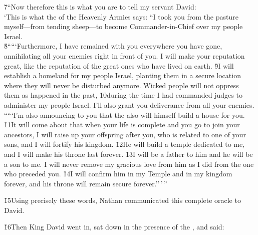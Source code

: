 \begin{poetry}
\poeml \v{7}``Now therefore this is what you are to tell my servant David: \\
\poeml `This is what the  of the Heavenly Armies says: ``I took you from the pasture myself---from tending sheep---to become Commander-in-Chief over my people Israel. \\
\poeml \v{8}`````Furthermore, I have remained with you everywhere you have gone, annihilating all your enemies right in front of you. I will make your reputation great, like the reputation of the great ones who have lived on earth. \v{9}I will establish a homeland for my people Israel, planting them in a secure location where they will never be disturbed anymore. Wicked people will not oppress them as happened in the past, \v{10}during the time I had commanded judges to administer my people Israel. I'll also grant you deliverance from all your enemies. \\
\poeml `````I'm also announcing to you that the  also will himself build a house for you. \v{11}It will come about that when your life is complete and you go to join your ancestors, I will raise up your offspring after you, who is related to one of your sons, and I will fortify his kingdom. \v{12}He will build a temple dedicated to me, and I will make his throne last forever. \v{13}I will be a father to him and he will be a son to me. I will never remove my gracious love from him as I did from the one who preceded you. \v{14}I will confirm him in my Temple and in my kingdom forever, and his throne will remain secure forever.''\,'\,''
\end{poetry}

\v{15}Using precisely these words, Nathan communicated this complete oracle to David.

\v{16}Then King David went in, sat down in the presence of the , and said:

